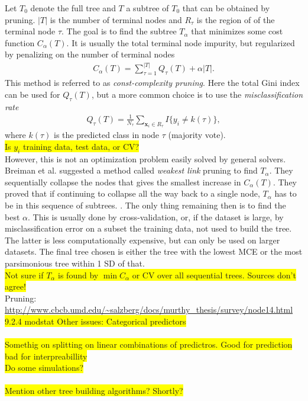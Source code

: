 Let $T_0$ denote the full tree and $T$ a subtree of $T_0$ that can be obtained by pruning. $|T|$ is the number of terminal nodes and $R_{\tau}$ is the region of of the terminal node $\tau$. The goal is to find the subtree $T_\alpha$ that minimizes some cost function $C_\alpha (T)$. It is usually the total terminal node impurity, but regularized by penalizing on the number of terminal nodes
\begin{align}
  C_\alpha (T) = \sum_{\tau = 1}^{|T|} Q_\tau (T) + \alpha |T|. 
\end{align}
This method is referred to as \textit{const-complexity pruning}.
Here the total Gini index can be used for $Q_\tau (T)$, but a more common choice is to use the \textit{misclassification rate} 
\begin{align}
  Q_\tau (T) =  \frac{1}{N_{\tau}} \sum_{\mathbf{x}_i \in R_{\tau}} I\{y_i \neq k(\tau)\},
\end{align}
where $k(\tau)$ is the predicted class in node $\tau$ (majority vote).
\\ \colorbox{yellow}{Is $y_i$ training data, test data, or CV?} \\
However, this is not an optimization problem easily solved by general solvers. Breiman et al. \cite{breiman} suggested a method called \textit{weakest link} pruning to find $T_\alpha$. They sequentially collapse the nodes that gives the smallest increase in $C_\alpha(T)$.
They proved that if continuing to collapse all the way back to a single node, $T_\alpha$ has to be in this sequence of subtrees.  . The only thing remaining then is to find the best $\alpha$. This is usually done by cross-validation, or, if the dataset is large, by misclassification error on a subset the training data, not used to build the tree. The latter is less computationally expensive, but can only be used on larger datasets. The final tree chosen is either the tree with the lowest MCE or the most parsimonious tree within 1 SD of that.
\\ \colorbox{yellow}{Not sure if $T_\alpha$ is found by $\min C_\alpha$ or CV over all sequential trees. Sources don't agree!}
\\ Pruning: \url{http://www.cbcb.umd.edu/~salzberg/docs/murthy_thesis/survey/node14.html}\\
\colorbox{yellow}{9.2.4 modstat Other issues: Categorical predictors} \\ \\
%
\colorbox{yellow}{Somethig on splitting on linear combinations of predictros. Good for prediction bad for interpreabillity}\\
\colorbox{yellow}{Do some simulations?}\\
\\\colorbox{yellow}{Mention other tree building algorithms? Shortly?}

